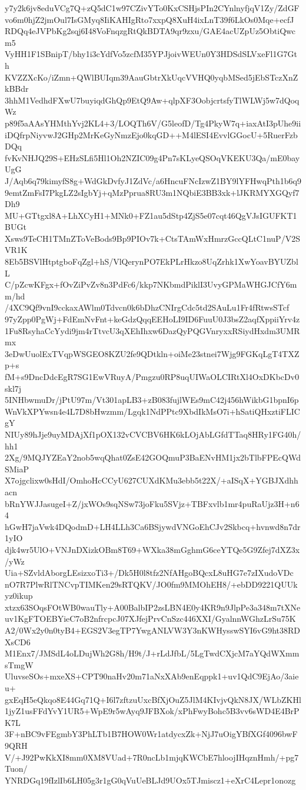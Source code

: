 y7y2k6jv8eduVCg7Q+zQ5dC1w97CZivYTo0KxCSHjsPIn2CYnlnyfjqV1Zy/ZdGF
vo6m0hjZ2jmOul7IsGMyq8IiKAHIgRto7xxpQ8XuH4ixLnT39f6LkOs0Mqe+ecfJ
RDQq4eJVPbKg2sqj6I48VoFnqzgRtQkBDTA9qr9zxu/GAE4acUZpUz5ObtiQwcm5
VyHH1F1SBnipT/bhy1i3cYdfVo5zcfM35YPJjoivWEUn0Y3HDSdSLVxeFl1G7Gth
KVZZXcKo/iZmn+QWlBUIqm39AauGbtrXkUqcVVHQ0yqbMSed5jEbSTczXnZkBBdr
3hhM1VedhdFXwU7buyiqdGhQp9EtQ9Aw+qlpXF3OobjcrtsfyTlWLWj5w7dQoqWz
p89f5aAAsYHMthYvj2KL4+3/LOQTh6V/G5leofD/Tg4PkyW7q+iaxAtI3pUhe9ii
iDQfrpNiyvwJ2GHp2MrKeGyNmzEjo0kqGD++M4lESI4EvvlGGocU+5RuerFzbDQq
fvKvNHJQ29S+EHzSLfi5Hl1Oh2NZIC09g4Pn7sKLyeQSOqVKEKU3Qa/mE0bayUgG
J/Aqb6q79kimyfS8g+WdGkDvfyJ1ZdVc/a6HncuFNcIzwZ1BY9lYFHwqPth1b6q9
9emtZmFsI7PkgLZ2sIgbYj+qMzPprua8RU3m1NQbiE3BB3xk+lJKRMYXGQyf7Dh9
MU+GTtgxl8A+LhXCyH1+MNk0+FZ1au5dStp4ZjS5e07cqt46QgVJsIGUFKT1BUGt
Xsws9TeCH1TMnZToVeBods9Bp9PIOv7k+CtsTAmWxHmrzGccQLtC1nuP/V2SVR1K
8Eb5BSVlHtptgboFqZgl+hS/VlQerynPO7EkPLrHkzo8UqZrhk1XwYoavBYUZblL
C/pZcwKFgx+fOvZiPvZv8n3PdFc6/kkp7NKbmdPiklI3UvyGPMaWHGJCfY6mm/hd
/4XC9Qf9vnI9cckaxAWlm0Tdvcn0k6bDhzCNIrgCdc5td2SAuLu1Fr4fRtwsSTcf
97yZpp0PgWj+FdEmNvFnt+keGdzQqqEEHoLI9ID6FuuU0J3bsZ2aqfXppiiYrv4z
1Fu8RsyhaCcYydi9jm4rTtvcU3qXEhIhxw6DazQyPQGVnryxxRSiydHxdm3UMRmx
3eDwUuolExTVqpWSGEO8KZU2fe9QDtkln+oiMe23stnei7Wjg9FGKqLgT4TXZp+s
fM+s9DncDdcEgR7SG1EwVRuyA/Pmgzu0RP8uqUIWaOLCIRtXl4OxDKbcDv0skl7j
5INHbwmuDr/jPtU97m/Vt301apLB3+zB083fujlWEs9mC42j456hWikbG1bpnI6p
WnVkXPYwsn4e4L7D8bHwzmm/Lgqk1NdPPtc9XbdIkMsO7i+hSatiQHxztiFLICgY
NIUy89hJje9uyMDAjXf1pOX132vCVCBV6HK6kLOjAbLGfdTTaq8HRy1FG40h/hh1
2Xg/9MQJYZEaY2nob5wqQhat0ZsE42GOQmuP3BaENvHM1jx2bTlbFPEcQWdSMiaP
X7ojgclixw0sHdI/OmhoHcCCyU627CUXdKMu3ebb5t22X/+aISqX+YGBJXdhhacn
bRnYWJJasugeI+Z/jxWOs9sqNSw73joFku5SVjz+TBFxvlb1mr4puRaUjz3H+n64
hGwH7jaVwk4DQodmD+LH4LLh3Ca6BSjywdVNGoEhCJv2Skbcq+hvnwd8n7dr1yIO
djk4wr5UlO+VNJnDXizkOBm8T69+WXka38mGghmG6ceYTQe5G9Zfej7dXZ3x/yWz
Uia+SZvldAborgLEsizxoTi3+/Dk5H0l8tfz2NfAHgoBQcxL8uHG7e7zIXudoVDc
nO7R7PlwRlTNCvpTIMKen29sRTQKV/JO0fm9MMOhEH8/+ebDD9221QUUkyz0ikup
xtzx63SOqsFOtWB0wauTly+A00BalbIP2zsLBN4E0y4KR9n9JlpPe3a348m7tXNe
uv1KgFTOEBYieC7oB2nfrcpcJ07XJfejPrvCnSzc446XXI/GyalnnWGhzLrSu75K
A2/0Wx2y0n0tyB4+EGS2V3egTP7YwgANLVW3Y3nKWHysswSYI6vG9ht38RDXsCD6
M1Enx7/JMSdL4oLDujWh2G8h/H9t/J+rLdJfbL/5LgTwdCXjcM7aYQdWXmmsTmgW
UluvseSOs+mxeXS+CPT90naHv20m71aNxXAb9enEqppk1+uv1QdC9EjAo/3aieu+
gxEqH5eQkqo8E44Gq71Q+I6l7zftzuUxcBfXjOuZ5JlM4KIvjvQkN8JX/WLbZKHl
1jyZ1usFFdYvY1UR5+WpE9r5wAyq9JFBXok/xPhFwyBohc5B3vv6sWD4E4BrPK7L
3F+nBC9vFEgmbY3PhLTb1B7HOW0Wr1atdycxZk+NjJ7uOigYBfXGf4096bwF9QRH
V/+J92PwKkXI8mm0XM8VUad+7R0ncLb1mjqKWCbE7hloojIHqznHmh/+pg7Tuon/
YNRDGq19fIzlIb6LH05g3r1gG0qVuUeBLJd9UOx5TJmiscz1+eXrC4Lepr1onozg
